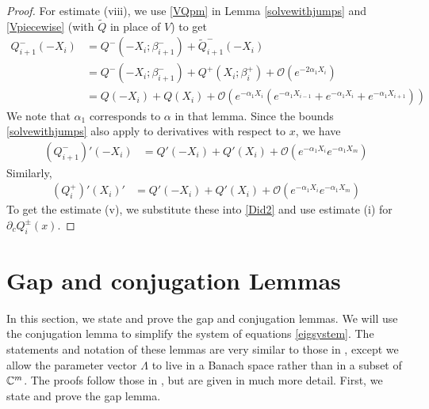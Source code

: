 \documentclass[thesis.tex]{subfiles}
\begin{document}
\begin{lemma}
\begin{proof}
For estimate (viii), we use \eqref{VQpm} in Lemma \ref{solvewithjumps} and \eqref{Vpiecewise} (with $\tilde{Q}$ in place of $V$) to get
\begin{align*}
Q_{i+1}^-(-X_i) &= Q^-(-X_i; \beta_{i+1}^-) + \tilde{Q}_{i+1}^-(-X_i) \\
&= Q^-(-X_i; \beta_{i+1} ^-) + Q^+(X_i; \beta_i^+) + \mathcal{O}(e^{-2 \alpha_1 X_i}) \\
&= Q(-X_i) + Q(X_i) 
+ \mathcal{O}(e^{-\alpha_1 X_i}(e^{-\alpha_1 X_{i-1}}+e^{-\alpha_1 X_i}+e^{-\alpha_1 X_{i+1}}))
\end{align*}
We note that $\alpha_1$ corresponds to $\alpha$ in that lemma. Since the bounds \ref{solvewithjumps} also apply to derivatives with respect to $x$, we have
\begin{align*}
(Q_{i+1}^-)'(-X_i) &= Q'(-X_i) + Q'(X_i) + \mathcal{O}(e^{-\alpha_1 X_i}e^{-\alpha_1 X_m})
\end{align*}
Similarly,
\begin{align*}
(Q_i^+)'(X_i)' &= Q'(-X_i) + Q'(X_i) + \mathcal{O}(e^{-\alpha_1 X_i}e^{-\alpha_1 X_m})
\end{align*}
To get the estimate (v), we substitute these into \eqref{Did2} and use estimate (i) for $\partial_c Q_i^\pm(x)$.
\end{proof}
\end{lemma}

\section{Gap and conjugation Lemmas}

In this section, we state and prove the gap and conjugation lemmas. We will use the conjugation lemma to simplify the system of equations \cref{eigsystem}. The statements and notation of these lemmas are very similar to those in \cite{Zumbrun2009}, except we allow the parameter vector $\Lambda$ to live in a Banach space rather than in a subset of $\mathbb{C}^m$. The proofs follow those in \cite{Zumbrun2009}, but are given in much more detail. First, we state and prove the gap lemma.
\end{document}
